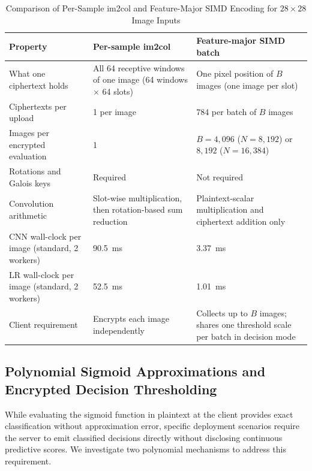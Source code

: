 \documentclass[conference]{IEEEtran}
\begin{document}
\begin{table}[t]
\caption{Comparison of Per-Sample im2col and Feature-Major SIMD Encoding for $28 \times 28$ Image Inputs}
\label{tab:encoding_cmp}
\centering
\footnotesize
\begin{tabular}{L{3.5cm} L{5.8cm} L{5.8cm}}
\toprule
\textbf{Property} & \textbf{Per-sample im2col} & \textbf{Feature-major SIMD batch} \\
\midrule
What one ciphertext holds & All 64 receptive windows of one image (64 windows $\times$ 64 slots) & One pixel position of $B$ images (one image per slot) \\
Ciphertexts per upload & 1 per image & 784 per batch of $B$ images \\
Images per encrypted evaluation & 1 & $B = 4{,}096$ ($N=8{,}192$) or $8{,}192$ ($N=16{,}384$) \\
Rotations and Galois keys & Required & Not required \\
Convolution arithmetic & Slot-wise multiplication, then rotation-based sum reduction & Plaintext-scalar multiplication and ciphertext addition only \\
CNN wall-clock per image (standard, 2 workers) & 90.5~ms & 3.37~ms \\
LR wall-clock per image (standard, 2 workers) & 52.5~ms & 1.01~ms \\
Client requirement & Encrypts each image independently & Collects up to $B$ images; shares one threshold scale per batch in decision mode \\
\bottomrule
\end{tabular}
\end{table}

\subsection{Polynomial Sigmoid Approximations and Encrypted Decision Thresholding}

While evaluating the sigmoid function in plaintext at the client provides exact classification without approximation error, specific deployment scenarios require the server to emit classified decisions directly without disclosing continuous predictive scores. We investigate two polynomial mechanisms to address this requirement.
\end{document}
